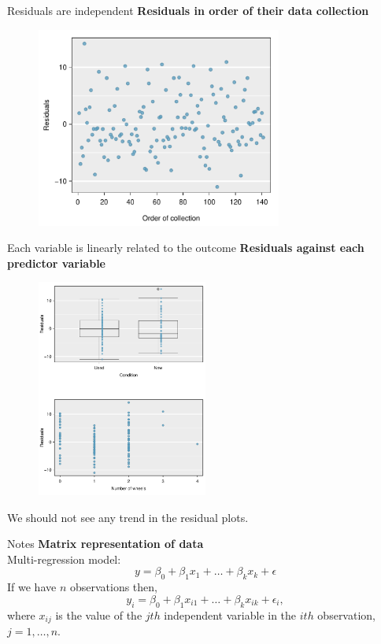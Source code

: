 \documentclass[12pt,a4paper]{beamer}
\begin{document}
			\begin{frame}{Residuals are independent}
				\textbf{Residuals in order of their data collection}
				\begin{figure}
				\centering
				\includegraphics[width=0.72\textwidth]{figures/marioKartDiagnostics/mkDiagnosticInOrder}
				\end{figure}
			\end{frame}
			\begin{frame}{Each variable is linearly related to the outcome}
				\textbf{Residuals against each predictor variable}
				\begin{figure}
				\centering
				\includegraphics[width=0.5\textwidth]{figures/marioKartDiagnostics/mkDiagnosticEvsVariables}
				\end{figure}
				We should not see any trend in the residual plots.
			\end{frame}
			\begin{frame}{Notes}
				\textbf{Matrix representation of data}\\
				Multi-regression model:
				\[y=\beta_0+\beta_1x_1+\dots+\beta_kx_k+\epsilon\]
				 If we have $n$ observations then,
				\[y_i=\beta_0+\beta_1x_{i1}+\dots+\beta_kx_{ik}+\epsilon_i,\]
				where $x_{ij}$ is the value of the $jth$ independent variable in the $ith$ observation, $j=1,\dots,n.$
			\end{frame}
\end{document}
